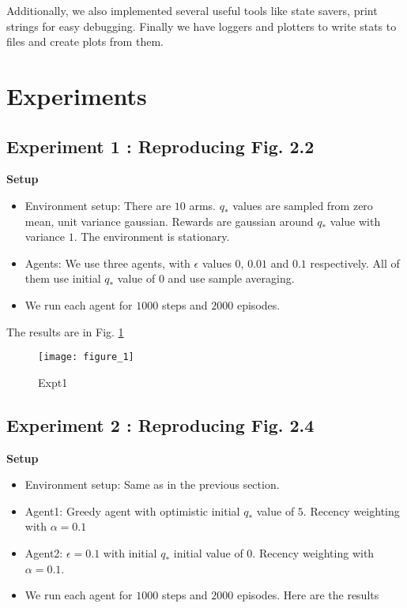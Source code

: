\documentclass{article}
\begin{document}
Additionally, we also implemented several useful tools like state savers, print strings for easy debugging. Finally we have loggers and plotters to write stats to files and create plots from them.

\section{Experiments}

\subsection{Experiment 1 : Reproducing Fig. 2.2}

\textbf{Setup}
\begin{itemize}
    \item Environment setup: There are $10$ arms. $q_*$ values are sampled from zero mean, unit variance gaussian. Rewards are gaussian around $q_*$ value with variance $1$. The environment is stationary.
    \item Agents: We use three agents, with $\epsilon$ values $0$, $0.01$ and $0.1$ respectively. All of them use initial $q_*$ value of $0$ and use sample averaging. 
    \item We run each agent for $1000$ steps and $2000$ episodes. 
\end{itemize}

The results are in Fig. \ref{expt1}

\begin{figure}
    \texttt{[image: figure\_1]}
    \caption{Expt1}
    \label{expt1}
\end{figure}

\subsection{Experiment 2 : Reproducing Fig. 2.4}

\textbf{Setup}
\begin{itemize}
    \item Environment setup: Same as in the previous section.
    \item Agent1: Greedy agent with optimistic initial $q_*$ value of $5$. Recency weighting with $\alpha = 0.1$
    \item Agent2: $\epsilon=0.1$ with initial $q_*$ initial value of $0$. Recency weighting with $\alpha = 0.1$. 
    \item We run each agent for $1000$ steps and $2000$ episodes. Here are the results
\end{itemize}
\end{document}
